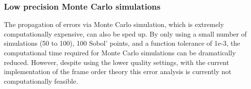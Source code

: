 

\subsubsection{Low precision Monte Carlo simulations}

The propagation of errors via Monte Carlo simulation, which is extremely computationally expensive, can also be sped up.
By only using a small number of simulations (50 to 100), 100 Sobol' points, and a function tolerance of 1e-3, the computational time required for Monte Carlo simulations can be dramatically reduced.
However, despite using the lower quality settings, with the current implementation of the frame order theory this error analysis is currently not computationally feasible.
